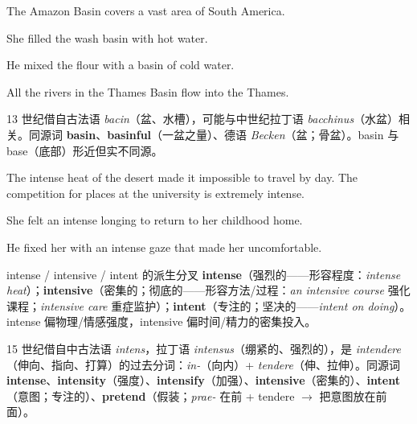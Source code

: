 \documentclass[../main.tex]{subfiles}
\begin{document}

{The Amazon Basin covers a vast area of South America.}

{She filled the wash basin with hot water.}

{He mixed the flour with a basin of cold water.}

{All the rivers in the Thames Basin flow into the Thames.}

\begin{origin}
13 世纪借自古法语 \textit{bacin}（盆、水槽），可能与中世纪拉丁语 \textit{bacchinus}（水盆）相关。同源词 \textbf{basin}、\textbf{basinful}（一盆之量）、德语 \textit{Becken}（盆；骨盆）。basin 与 base（底部）形近但实不同源。
\end{origin}


{The intense heat of the desert made it impossible to travel by day.}
{The competition for places at the university is extremely intense.}

{She felt an intense longing to return to her childhood home.}

{He fixed her with an intense gaze that made her uncomfortable.}

\begin{gram}{intense / intensive / intent 的派生分叉}
\textbf{intense}（强烈的——形容程度：\textit{intense heat}）；\textbf{intensive}（密集的；彻底的——形容方法/过程：\textit{an intensive course} 强化课程；\textit{intensive care} 重症监护）；\textbf{intent}（专注的；坚决的——\textit{intent on doing}）。intense 偏物理/情感强度，intensive 偏时间/精力的密集投入。
\end{gram}

\begin{origin}
15 世纪借自中古法语 \textit{intens}，拉丁语 \textit{intensus}（绷紧的、强烈的），是 \textit{intendere}（伸向、指向、打算）的过去分词：\textit{in-}（向内）+ \textit{tendere}（伸、拉伸）。同源词 \textbf{intense}、\textbf{intensity}（强度）、\textbf{intensify}（加强）、\textbf{intensive}（密集的）、\textbf{intent}（意图；专注的）、\textbf{pretend}（假装；\textit{prae-} 在前 + tendere $\to$ 把意图放在前面）。
\end{origin}
\end{document}
